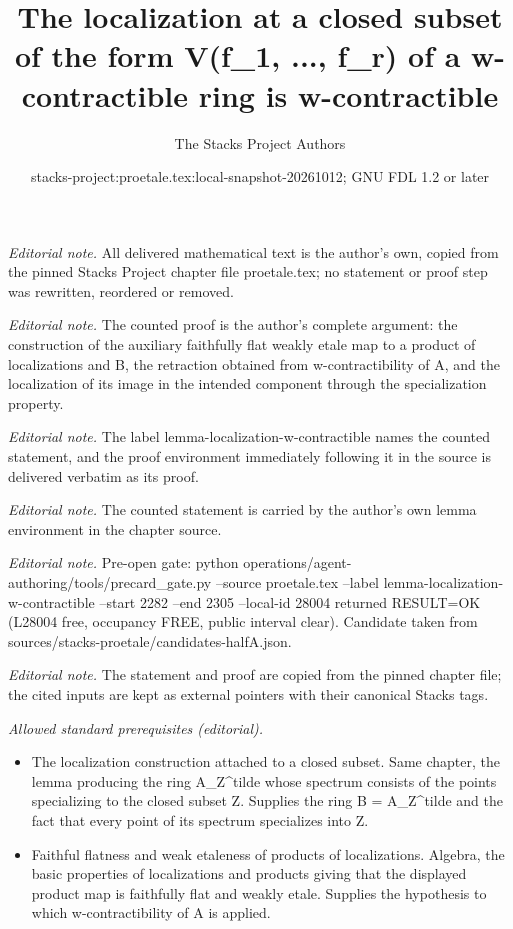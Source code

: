 \documentclass[10pt,a4paper]{amsart}
\title{The localization at a closed subset of the form V(f\_1, ..., f\_r) of a w-contractible ring is w-contractible}
\author{The Stacks Project Authors}
\date{stacks-project:proetale.tex:local-snapshot-20261012; GNU FDL 1.2 or later}
\theoremstyle{plain}
\theoremstyle{definition}
\theoremstyle{remark}
\numberwithin{equation}{subsection}
\begin{document}
\maketitle
\noindent\textit{Editorial note.} All delivered mathematical text is the author's own, copied from the pinned Stacks Project chapter file proetale.tex; no statement or proof step was rewritten, reordered or removed.\par\medskip
\noindent\textit{Editorial note.} The counted proof is the author's complete argument: the construction of the auxiliary faithfully flat weakly etale map to a product of localizations and B, the retraction obtained from w-contractibility of A, and the localization of its image in the intended component through the specialization property.\par\medskip
\noindent\textit{Editorial note.} The label lemma-localization-w-contractible names the counted statement, and the proof environment immediately following it in the source is delivered verbatim as its proof.\par\medskip
\noindent\textit{Editorial note.} The counted statement is carried by the author's own lemma environment in the chapter source.\par\medskip
\noindent\textit{Editorial note.} Pre-open gate: python operations/agent-authoring/tools/precard\_gate.py --source proetale.tex --label lemma-localization-w-contractible --start 2282 --end 2305 --local-id 28004 returned RESULT=OK (L28004 free, occupancy FREE, public interval clear). Candidate taken from sources/stacks-proetale/candidates-halfA.json.\par\medskip
\noindent\textit{Editorial note.} The statement and proof are copied from the pinned chapter file; the cited inputs are kept as external pointers with their canonical Stacks tags.\par\medskip
\noindent\textit{Allowed standard prerequisites (editorial).}\begin{itemize}
\item The localization construction attached to a closed subset. Same chapter, the lemma producing the ring A\_Z\textasciicircum{}tilde whose spectrum consists of the points specializing to the closed subset Z. Supplies the ring B = A\_Z\textasciicircum{}tilde and the fact that every point of its spectrum specializes into Z.
\item Faithful flatness and weak etaleness of products of localizations. Algebra, the basic properties of localizations and products giving that the displayed product map is faithfully flat and weakly etale. Supplies the hypothesis to which w-contractibility of A is applied.
\end{itemize}\medskip
\end{document}
